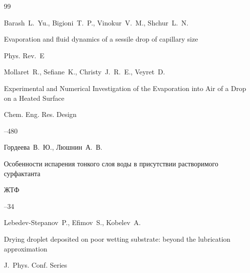 \begin{thebibliography}{99}

\by Barash~L.~Yu., Bigioni~T.~P., Vinokur~V.~M., Shchur~L.~N.

\paper  Evaporation and fluid dynamics of a sessile drop of capillary size

\jour Phys. Rev.~E









\by Mollaret~R., Sefiane~K., Christy~J.~R.~E., Veyret~D.

\paper Experimental and Numerical Investigation of the Evaporation into Air of a Drop on a Heated Surface

\jour Chem. Eng. Res. Design 




--480





\by Гордеева~В.~Ю., Люшнин~А.~В.

\paper Особенности испарения тонкого слоя воды в присутствии растворимого сурфактанта

\jour ЖТФ




--34




\by  Lebedev-Stepanov~P., Efimov~S., Kobelev~A. 

\paper Drying droplet deposited on poor wetting substrate: beyond the lubrication approximation

\jour J.~Phys. Conf. Series









\end{thebibliography}

